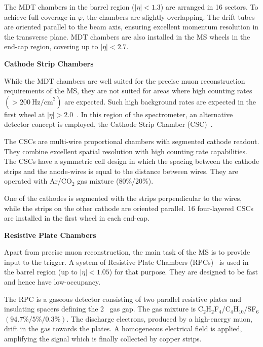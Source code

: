 The MDT chambers in the barrel region ($|\eta|<1.3$) are arranged in 16 sectors.
To achieve full coverage in $\varphi$, the chambers are slightly overlapping.
The drift tubes are oriented parallel to the beam axis, ensuring excellent momentum resolution in the transverse plane.
MDT chambers are also installed in the MS wheels in the end-cap region, covering up to $|\eta|<2.7$.


\vspace{.5cm}
\noindent
\textbf{Cathode Strip Chambers}
\vspace{.5cm}

\noindent
While the MDT chambers are well suited for the precise muon reconstruction requirements of the MS,
they are not suited for areas where high counting rates $(>200~\text{Hz/cm}^2)$ are expected.
Such high background rates are expected in the first wheel at 
$|\eta|>2.0$~\cite{ATLAS-TDR-10}.
In this region of the spectrometer, an alternative detector concept is employed, the Cathode Strip Chamber (CSC)~\cite{ATLAS_CSC}.

The CSCs are multi-wire proportional chambers with segmented cathode readout.
They combine excellent spatial resolution with high counting rate capabilities.
The CSCs have a symmetric cell design in which the spacing between the cathode strips and the anode-wires is equal to the distance between wires. They are operated with Ar/CO$_2$ gas mixture (80\%/20\%).

One of the cathodes is segmented
with the strips perpendicular to the wires, while the strips on the other cathode are oriented parallel.
16 four-layered CSCs are installed in the first wheel in each end-cap.

\vspace{.5cm}
\noindent
\textbf{Resistive Plate Chambers}
\vspace{.5cm}

\noindent
Apart from precise muon reconstruction, the main task of the MS is to provide input to the trigger.
A system of Resistive Plate Chambers (RPCs)~\cite{ATLAS_RPC} is used in the barrel region (up to $|\eta|<1.05$) for that purpose.
They are designed to be fast and hence have low-occupancy.

The RPC is a gaseous detector consisting of two parallel resistive plates and insulating spacers defining the 2~ gas gap.
The gas mixture is C$_2$H$_2$F$_4$/C$_4$H$_{10}$/SF$_6$ $(94.7\% / 5\% / 0.3\%)$.
The discharge electrons, produced by a high-energy muon, drift in the gas towards the plates.
A homogeneous electrical field is applied, amplifying the signal which is finally collected by copper strips.

